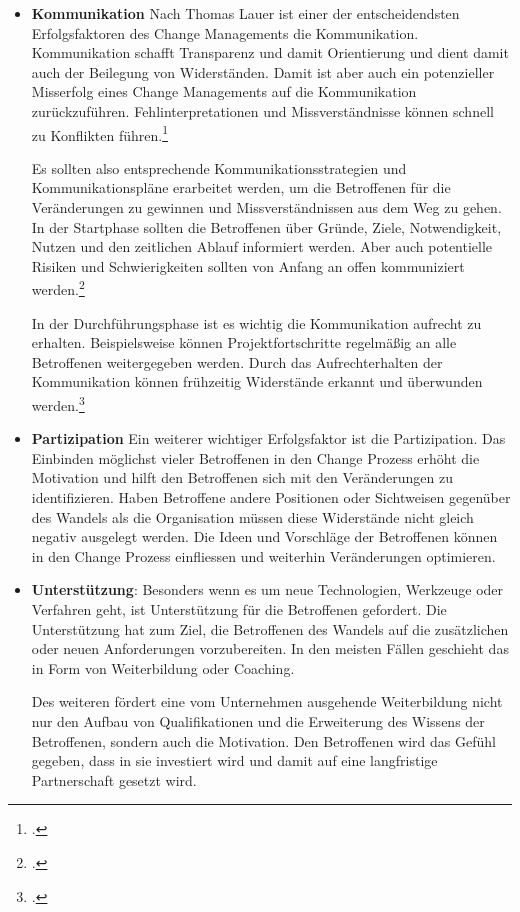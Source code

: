\begin{itemize}
	\item \textbf{Kommunikation}
	Nach Thomas Lauer ist einer der entscheidendsten Erfolgsfaktoren des Change Managements die Kommunikation. Kommunikation schafft Transparenz und damit Orientierung und dient damit auch der Beilegung von Widerständen. Damit ist aber auch ein potenzieller Misserfolg eines Change Managements auf die Kommunikation zurückzuführen. Fehlinterpretationen und Missverständnisse können schnell zu Konflikten führen.\footcite[Vgl.][]{lauer_change_2014}
	
	Es sollten also entsprechende Kommunikationsstrategien und Kommunikationspläne erarbeitet werden, um die Betroffenen für die Veränderungen zu gewinnen und Missverständnissen aus dem Weg zu gehen. In der Startphase sollten die Betroffenen über Gründe, Ziele, Notwendigkeit, Nutzen und den zeitlichen Ablauf informiert werden. Aber auch potentielle Risiken und Schwierigkeiten sollten von Anfang an offen kommuniziert werden.\footcite[Vgl.][]{sonntag_change_2008}
	
	In der Durchführungsphase ist es wichtig die Kommunikation aufrecht zu erhalten. Beispielsweise können Projektfortschritte regelmäßig an alle Betroffenen weitergegeben werden. Durch das Aufrechterhalten der Kommunikation können frühzeitig Widerstände erkannt und überwunden werden.\footcite[Vgl.][]{lauer_change_2014}
	
	\item \textbf{Partizipation}
	Ein weiterer wichtiger Erfolgsfaktor ist die Partizipation. Das Einbinden möglichst vieler Betroffenen in den Change Prozess erhöht die Motivation und hilft den Betroffenen sich mit den Veränderungen zu identifizieren. Haben Betroffene andere Positionen oder Sichtweisen gegenüber des Wandels als die Organisation müssen diese Widerstände nicht gleich negativ ausgelegt werden. Die Ideen und Vorschläge der Betroffenen können in den Change Prozess einfliessen und weiterhin Veränderungen optimieren.
	
	\item \textbf{Unterstützung}:
	Besonders wenn es um neue Technologien, Werkzeuge oder Verfahren geht, ist Unterstützung für die Betroffenen gefordert. Die Unterstützung hat zum Ziel, die Betroffenen des Wandels auf die zusätzlichen oder neuen Anforderungen vorzubereiten. In den meisten Fällen geschieht das in Form von Weiterbildung oder Coaching.
	
	Des weiteren fördert eine vom Unternehmen ausgehende Weiterbildung nicht nur den Aufbau von Qualifikationen und die Erweiterung des Wissens der Betroffenen, sondern auch die Motivation. Den Betroffenen wird das Gefühl gegeben, dass in sie investiert wird und damit auf eine langfristige Partnerschaft gesetzt wird.
\end{itemize}

